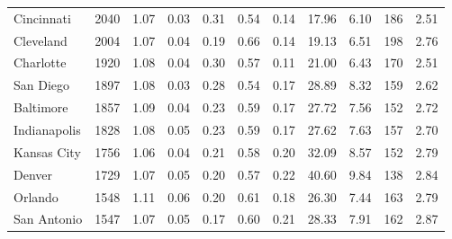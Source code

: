 \documentclass[Afour,sageh,times]{sagej}
\begin{document}
\begin{landscape}
\begin{table}
\begin{tabular}{p{2.5cm} p{1.5cm} p{1.5cm} p{1.5cm} p{1.55cm} p{1.5cm} p{1.5cm} p{1.5cm} p{1.5cm} p{1.5cm} p{1.5cm}}
Cincinnati           & 2040          & 1.07         & 0.03                       & 0.31           & 0.54        & 0.14        & 17.96                 & 6.10                  & 186                   & 2.51             \\
Cleveland            & 2004          & 1.07         & 0.04                       & 0.19           & 0.66        & 0.14        & 19.13                 & 6.51                  & 198                   & 2.76             \\
Charlotte            & 1920          & 1.08         & 0.04                       & 0.30           & 0.57        & 0.11        & 21.00                 & 6.43                  & 170                   & 2.51             \\
San Diego            & 1897          & 1.08         & 0.03                       & 0.28           & 0.54        & 0.17        & 28.89                 & 8.32                  & 159                   & 2.62             \\
Baltimore            & 1857          & 1.09         & 0.04                       & 0.23           & 0.59        & 0.17        & 27.72                 & 7.56                  & 152                   & 2.72             \\
Indianapolis         & 1828          & 1.08         & 0.05                       & 0.23           & 0.59        & 0.17        & 27.62                 & 7.63                  & 157                   & 2.70             \\
Kansas City          & 1756          & 1.06         & 0.04                       & 0.21           & 0.58        & 0.20        & 32.09                 & 8.57                  & 152                   & 2.79             \\
Denver               & 1729          & 1.07         & 0.05                       & 0.20           & 0.57        & 0.22        & 40.60                 & 9.84                  & 138                   & 2.84             \\
Orlando              & 1548          & 1.11         & 0.06                       & 0.20           & 0.61        & 0.18        & 26.30                 & 7.44                  & 163                   & 2.79             \\
San Antonio          & 1547          & 1.07         & 0.05                       & 0.17           & 0.60        & 0.21        & 28.33                 & 7.91                  & 162                   & 2.87             \\

\end{tabular}
\end{table}
\end{landscape}
\end{document}
